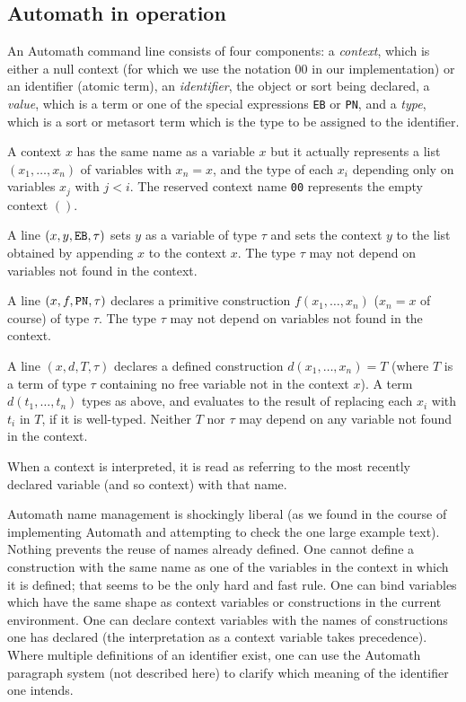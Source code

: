 \documentclass[12pt]{article}
\begin{document}
\subsection{Automath in operation}

An Automath command line consists of four components:  a {\em context\/}, which is either a null context (for which we use the notation 00 in our implementation)  or an identifier (atomic term), an {\em identifier\/}, the object or sort being declared, a {\em value}, which is a term or one of the special expressions {\tt EB} or {\tt PN}, and a {\em type}, which is a sort or metasort term which is the type to be assigned to the identifier.

A context $x$ has the same name as a variable $x$ but it actually represents a list $(x_1,\ldots,x_n)$ of variables with $x_n=x$, and the type
of each $x_i$ depending only on variables $x_j$ with $j<i$.  The reserved context name {\tt 00} represents the empty context $()$.

A line $(x,y,{\tt EB},\tau)$ sets $y$ as a variable of type $\tau$ and sets the context $y$ to the list obtained by appending $x$ to the context $x$.  The type $\tau$ may not depend on variables not found in the context.

A line $(x,f,{\tt PN},\tau)$ declares a primitive construction $f(x_1,\ldots,x_n)$ ($x_n=x$ of course) of type $\tau$.  The type $\tau$ may not depend on variables not found in the context.

A line $(x,d,T,\tau)$ declares a defined construction $d(x_1,\ldots,x_n)=T$ (where $T$ is a term of type $\tau$ containing no free variable not in the context $x$).
A term $d(t_1,\ldots,t_n)$ types as above, and evaluates to the result of replacing each $x_i$ with $t_i$ in $T$, if it is well-typed.  Neither $T$ nor $\tau$ may depend on any variable not found in the context. 

When a context is interpreted, it is read as referring to the most recently declared variable (and so context) with that name.

Automath name management is shockingly liberal (as we found in the course of implementing Automath and attempting to check the one large example text).
Nothing prevents the reuse of names already defined.  One cannot define a construction with the same name as one of the variables in the context in which it is defined;  that seems to be the only hard and fast rule.  One can bind variables which have the same shape as context variables or constructions in the current environment.  One can declare context variables with the names of constructions one has declared (the interpretation as a context variable takes precedence).  Where multiple definitions of an identifier exist, one can use the Automath paragraph system (not described here) to clarify which meaning of the identifier one intends.
\end{document}
